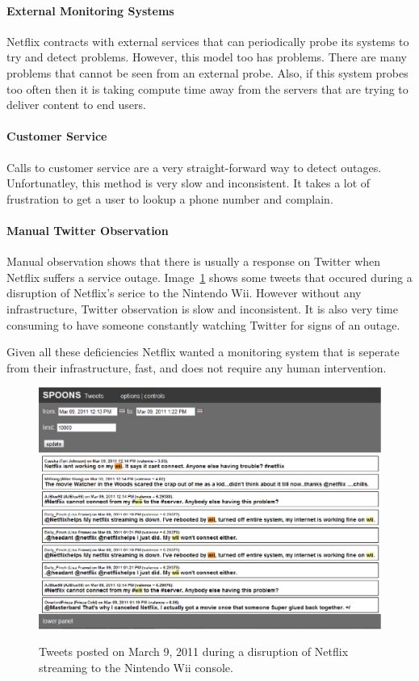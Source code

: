 \documentclass[12pt]{ucthesis}
\newcommand{\captionfonts}{\small\bf\ssp}
\begin{document}
\paragraph{External Monitoring Systems}
Netflix contracts with external services that can periodically probe its systems to try and detect problems.
However, this model too has problems. There are many problems that cannot be seen from an external probe.
Also, if this system probes too often then it is taking compute time away from the servers that are trying to deliver
content to end users.

\paragraph{Customer Service}
Calls to customer service are a very straight-forward way to detect outages.
Unfortunatley, this method is very slow and inconsistent. It takes a lot of frustration to get a user to
lookup a phone number and complain.

\paragraph{Manual Twitter Observation}
Manual observation shows that there is usually a response on Twitter when Netflix suffers a service
outage. Image~\ref{fig:tweetEx} shows some tweets that occured during a disruption of Netflix's serice to
the Nintendo Wii. However without any infrastructure, Twitter observation is slow and inconsistent.
It is also very time consuming to have someone constantly watching Twitter for signs of an outage.

Given all these deficiencies Netflix wanted a monitoring system that is seperate from their infrastructure,
fast, and does not require any human intervention\cite{kevin}.

\begin{figure}
   \begin{center}
      \includegraphics[width=140mm]{images/tweetexample.eps}
      \captionfonts
      \caption[Outage Tweets Example]{Tweets posted on March 9, 2011 during a disruption of Netflix
                                       streaming to the Nintendo Wii console.}
      \label{fig:tweetEx}
   \end{center}
\end{figure}
\end{document}
